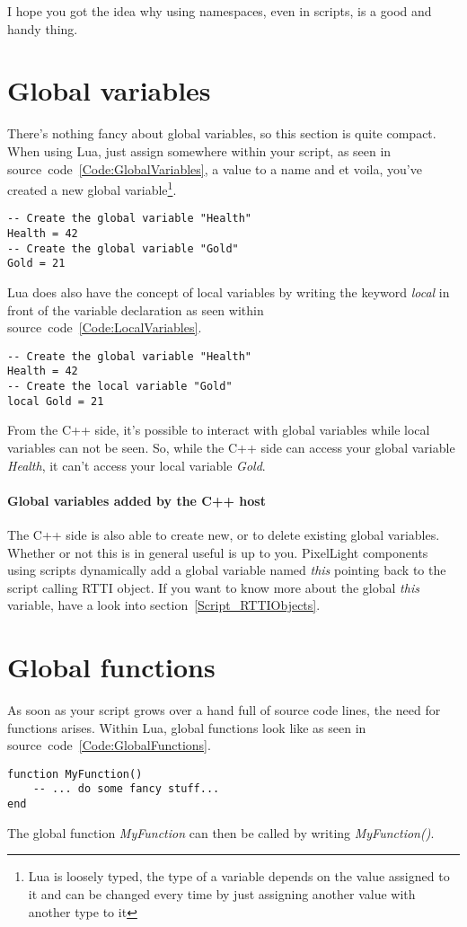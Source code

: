 I hope you got the idea why using namespaces, even in scripts, is a good and handy thing.




\section{Global variables}
\label{Script_GlobalVariables}
There's nothing fancy about global variables, so this section is quite compact. When using Lua, just assign somewhere within your script, as seen in source~code~\ref{Code:GlobalVariables}, a value to a name and et voila, you've created a new global variable\footnote{Lua is loosely typed, the type of a variable depends on the value assigned to it and can be changed every time by just assigning another value with another type to it}.
\begin{lstlisting}[float=htb,label=Code:GlobalVariables,caption={Global variables}]
-- Create the global variable "Health"
Health = 42
-- Create the global variable "Gold"
Gold = 21
\end{lstlisting}

Lua does also have the concept of local variables by writing the keyword \emph{local} in front of the variable declaration as seen within source~code~\ref{Code:LocalVariables}.
\begin{lstlisting}[float=htb,label=Code:LocalVariables,caption={Local variables}]
-- Create the global variable "Health"
Health = 42
-- Create the local variable "Gold"
local Gold = 21
\end{lstlisting}
From the C++ side, it's possible to interact with global variables while local variables can not be seen. So, while the C++ side can access your global variable \emph{Health}, it can't access your local variable \emph{Gold}.

\paragraph{Global variables added by the C++ host}
The C++ side is also able to create new, or to delete existing global variables. Whether or not this is in general useful is up to you. PixelLight components using scripts dynamically add a global variable named \emph{this} pointing back to the script calling RTTI object. If you want to know more about the global \emph{this} variable, have a look into section~\ref{Script_RTTIObjects}.





\section{Global functions}
\label{Script_GlobalFunctions}
As soon as your script grows over a hand full of source code lines, the need for functions arises. Within Lua, global functions look like as seen in source~code~\ref{Code:GlobalFunctions}.
\begin{lstlisting}[float=htb,label=Code:GlobalFunctions,caption={Global functions}]
function MyFunction()
	-- ... do some fancy stuff...
end
\end{lstlisting}
The global function \emph{MyFunction} can then be called by writing \emph{MyFunction()}.

